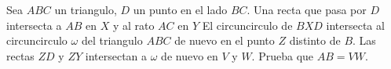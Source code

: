 \documentclass[11pt]{scrartcl}
\newcommand{\thmdifficulty}{0}
\newcommand{\problemdiff}[1]{\renewcommand{\thmdifficulty}{#1}}
\begin{document}
\problemdiff{4}

\begin{problem}
    Sea $ABC$ un triangulo, $D$ un punto en el lado $BC$. Una recta que pasa por $D$ intersecta a $AB$ en $X$ y al rato $AC$ en $Y$ 
    El circuncirculo de $BXD$ intersecta al circuncirculo $\omega$ del triangulo $ABC$ de nuevo en el punto $Z$ distinto de $B$. Las rectas $ZD$ y $ZY$ intersectan a $\omega$ de nuevo en $V$ y $W$. Prueba que 
    $AB=VW$.

\end{problem}
\end{document}
